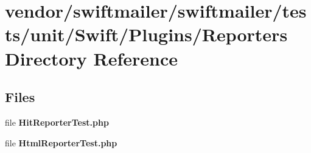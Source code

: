 \section{vendor/swiftmailer/swiftmailer/tests/unit/\+Swift/\+Plugins/\+Reporters Directory Reference}
\label{dir_e78e49f26af99b7c69691e05a67e695a}
\subsection*{Files}
\begin{DoxyCompactItemize}
\item 
file {\bf Hit\+Reporter\+Test.\+php}
\item 
file {\bf Html\+Reporter\+Test.\+php}
\end{DoxyCompactItemize}
